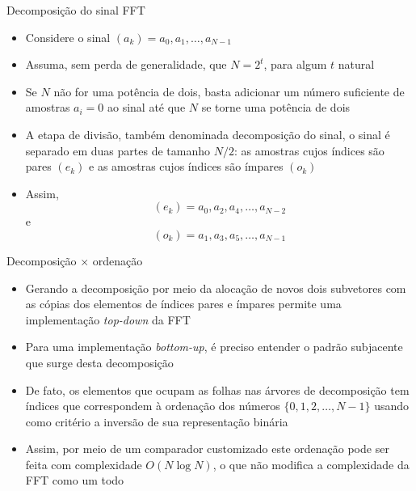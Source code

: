 \begin{frame}[fragile]{Decomposição do sinal FFT}

    \begin{itemize}
        \item Considere o sinal $(a_k) = a_0, a_1, \ldots, a_{N-1}$

        \item Assuma, sem perda de generalidade, que $N = 2^t$, para algum $t$ natural

        \item Se $N$ não for uma potência de dois, basta adicionar um número suficiente de amostras
            $a_i = 0$ ao sinal até que $N$ se torne uma potência de dois

        \item A etapa de divisão, também denominada decomposição do sinal, o sinal é separado
            em duas partes de tamanho $N/2$: as amostras cujos índices são pares $(e_k)$ e as 
            amostras cujos índices são ímpares $(o_k)$

        \item Assim,
        \[
            (e_k) = a_0, a_2, a_4, \ldots, a_{N - 2}
        \]
        e
        \[
            (o_k) = a_1, a_3, a_5, \ldots, a_{N - 1}
        \]
    \end{itemize}

\end{frame}



\begin{frame}[fragile]{Decomposição $\times$ ordenação}

    \begin{itemize}
        \item Gerando a decomposição por meio da alocação de novos dois subvetores com as cópias
            dos elementos de índices pares e ímpares permite uma implementação \textit{top-down}
            da FFT

        \item Para uma implementação \textit{bottom-up}, é preciso entender
            o padrão subjacente que surge desta decomposição

        \item De fato, os elementos que ocupam as folhas nas árvores de decomposição tem índices
            que correspondem à ordenação dos números $\{ 0, 1, 2, \ldots, N - 1\}$ usando como
            critério a inversão de sua representação binária

        \item Assim, por meio de um comparador customizado este ordenação pode ser feita 
            com complexidade $O(N\log N)$, o que não modifica a complexidade da FFT como um todo
    \end{itemize}

\end{frame}


